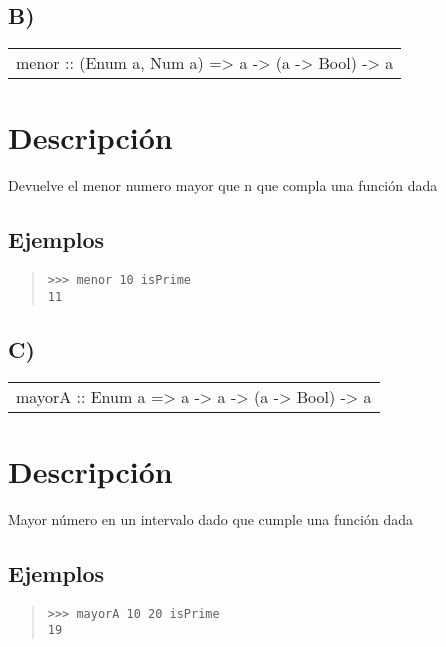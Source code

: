 \subsection{B)}
\begin{haddockdesc}
\item[\begin{tabular}{@{}l}
menor :: (Enum a, Num a) => a -> (a -> Bool) -> a
\end{tabular}]
{\haddockbegindoc
\section*{Descripción}
Devuelve el menor numero mayor que n que compla una función dada\par
\subsection*{Ejemplos}
\begin{quote}
{\haddockverb\begin{verbatim}
>>> menor 10 isPrime
11

\end{verbatim}}
\end{quote}}
\end{haddockdesc}
\subsection{C)}
\begin{haddockdesc}
\item[\begin{tabular}{@{}l}
mayorA :: Enum a => a -> a -> (a -> Bool) -> a
\end{tabular}]
{\haddockbegindoc
\section*{Descripción}
Mayor número en un intervalo dado que cumple una función dada\par
\subsection*{Ejemplos}
\begin{quote}
{\haddockverb\begin{verbatim}
>>> mayorA 10 20 isPrime
19

\end{verbatim}}
\end{quote}}
\end{haddockdesc}
